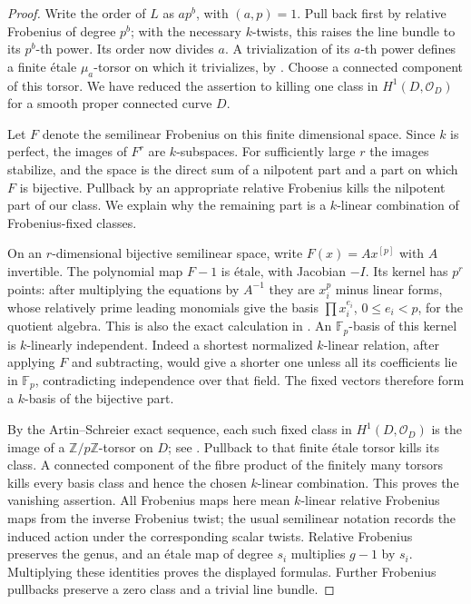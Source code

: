 \begin{proof}
Write the order of $L$ as $ap^b$, with $(a,p)=1$.
Pull back first by relative Frobenius of degree $p^b$;
with the necessary $k$-twists, this raises the line bundle
to its $p^b$-th power.  Its order now divides $a$.
A trivialization of its $a$-th power defines a finite
\'etale $\mu_a$-torsor on which it trivializes, by
\cite[Lemmas 59.28.1 and 59.28.5, section 03PK]
{StacksBFiniteCone}.  Choose a connected component of this
torsor.  We have reduced the assertion to killing one class
in $H^1(D,\mathcal O_D)$ for a smooth proper connected curve
$D$.

Let $F$ denote the semilinear Frobenius on this finite
dimensional space.  Since $k$ is perfect, the images of
$F^r$ are $k$-subspaces.  For sufficiently large $r$ the
images stabilize, and the space is the direct sum of a
nilpotent part and a part on which $F$ is bijective.
Pullback by an appropriate relative Frobenius kills the
nilpotent part of our class.  We explain why the remaining
part is a $k$-linear combination of Frobenius-fixed classes.

On an $r$-dimensional bijective semilinear space, write
$F(x)=A x^{[p]}$ with $A$ invertible.  The polynomial map
$F-1$ is \'etale, with Jacobian $-I$.  Its kernel has
$p^r$ points: after multiplying the equations by $A^{-1}$
they are $x_i^p$ minus linear forms, whose relatively
prime leading monomials give the basis
$\prod x_i^{e_i}$, $0\leq e_i<p$, for the quotient algebra.
This is also the exact calculation in
\cite[Lemma 59.63.2, section 0A3J]{StacksBFiniteCone}.
An $\mathbb F_p$-basis of this kernel is $k$-linearly
independent.  Indeed a shortest normalized $k$-linear
relation, after applying $F$ and subtracting, would give
a shorter one unless all its coefficients lie in
$\mathbb F_p$, contradicting independence over that field.
The fixed vectors therefore form a $k$-basis of the
bijective part.

By the Artin--Schreier exact sequence, each such fixed
class in $H^1(D,\mathcal O_D)$ is the image of a
$\mathbb Z/p\mathbb Z$-torsor on $D$; see
\cite[section 59.63, tag 0A3J]{StacksBFiniteCone}.
Pullback to that finite \'etale torsor kills its class.
A connected component of the fibre product of the
finitely many torsors kills every basis class and hence
the chosen $k$-linear combination.  This proves the
vanishing assertion.  All Frobenius maps here mean
$k$-linear relative Frobenius maps from the inverse
Frobenius twist; the usual semilinear notation records
the induced action under the corresponding scalar twists.
Relative Frobenius preserves the genus, and an \'etale
map of degree $s_i$ multiplies $g-1$ by $s_i$.
Multiplying these identities proves the displayed
formulas.  Further Frobenius pullbacks preserve a zero
class and a trivial line bundle.
\end{proof}

